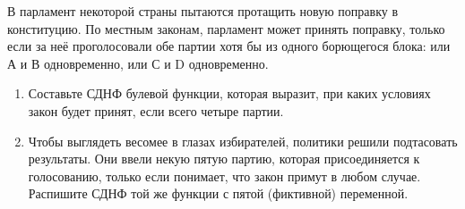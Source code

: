 \question
В парламент некоторой страны пытаются протащить новую поправку в конституцию. По местным законам, парламент может принять поправку, только если за неё проголосовали обе партии хотя бы из одного борющегося блока: или А и В одновременно, или С и D одновременно.

\begin{enumerate}
    \item Составьте СДНФ булевой функции, которая выразит, при каких условиях закон будет принят, если всего четыре партии.
    \item Чтобы выглядеть весомее в глазах избирателей, политики решили подтасовать результаты.  Они ввели некую пятую партию, которая присоединяется к голосованию, только если понимает, что закон примут в любом случае. Распишите СДНФ той же функции с пятой (фиктивной) переменной.
\end{enumerate}